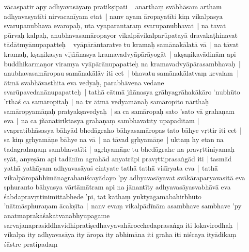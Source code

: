 \documentclass[article,12pt,a4paper]{memoir}%
\newcommand{\persName}[1]{#1}
\begin{document}
	  
	  \pstart \leavevmode%
	\label{thakur75-135.16}\persName{vācaspatir} apy adhyavasāyaṃ pratikṣipati | \label{quote-nk-adhyavasāya-start} anarthaṃ svābhāsam artham adhyavasyatīti nirvacanīyam etat | nanv ayam āropayatīti kiṃ vikalpasya svarūpānubhava evāropaḥ, uta vyāpārāntaraṃ svarūpānubhavāt | na tāvat pūrvaḥ kalpaḥ, anubhavasamāropayor vikalpāvikalparūpatayā dravakaṭhinavat tādātmyānupapatteḥ | vyāpārāntaratve tu kramaḥ samānakālatā vā | na tāvat kramaḥ, kṣaṇikasya vijñānasya kramavadvyāpārāyogāt | akṣaṇikavādinām api buddhikarmaṇor viramya vyāpārānupapatteḥ na kramavadvyāpārasambhavaḥ | anubhavasamāropau samānakālāv iti cet | bhavatu samānakālatvaṃ kevalam | ātmā svabhāvasthita eva vedyaḥ, parabhāvena vedane svarūpavedanānupapatteḥ | tathā cātmā jñānasya grāhyagrāhakākāro 'nubhūto 'rthaś ca samāropitaḥ | na tv ātmā vedyamānaḥ samāropito nārthaḥ samāropyamāṇaḥ pratyakṣavedyaḥ | sa ca samāropaḥ sato 'sato vā grahaṇam eva | na ca jñānātiriktasya grahaṇaṃ sambhavatīty upapāditam |\label{thakur75-135.27} svapratibhāsasya bāhyād bhedāgraho bāhyasamāropas tato bāhye vṛttir iti cet | sa kiṃ gṛhyamāṇe bāhye na vā | na tāvad gṛhyamāṇe | uktaṃ hy etan na \label{ratnakīrtinibandhāvali__36r1PF7IMS9V2FE679H8QDDC4HL}tadagrahaṇaṃ\label{ratnakīrtinibandhāvali__36r1PF7IMS7TSIJTA6L3F390OH3} sambhavatīti | agṛhyamāṇe tu bhedāgrahe na pravṛttiniyamaḥ syāt, anyeṣām api tadānīm agrahād anyatrāpi pravṛttiprasaṅgād iti \label{quote-nk-adhyavasāya-end}| tasmād yathā yathāyam adhyavasāyaś cintyate tathā tathā viśīryata eva | tathā vikalpāropābhimānagrahaniścayādayo 'py adhyavasāyavat svākāraparyavasitā eva sphuranto bāhyasya vārtāmātram api na jānantīty adhyavasāyasvabhāvā eva \label{ratnakīrtinibandhāvali__36r1PF7IMS5TO6HY4RVSXOVCLO1}śabdapravṛttinimittabhede\label{ratnakīrtinibandhāvali__36r1PF7IMS3RQL7PXXLRXDJR361} 'pi, tat kathaṃ yuktyāgamābahirbhūto 'nātmāsphuraṇam ācakṣīta | \label{thakur75-136.3} nanv evaṃ vikalpādīnām asambhave sambhave 'py anātmaprakāśakatvānabhyupagame sarvajanaprasiddhavidhipratiṣedhavyavahārocchedaprasaṅga iti lokavirodhaḥ | vikalpa ity adhyavasāya ity āropa ity abhimāna iti graha iti niścaya ityādikaṃ śāstre pratipadaṃ 
\end{document}
